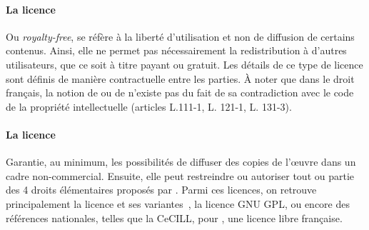         \paragraph{La licence }
            Ou \textit{royalty-free}, se réfère à la liberté d'utilisation et non de diffusion de certains contenus. Ainsi, elle ne permet pas nécessairement la redistribution à d'autres utilisateurs, que ce soit à titre payant ou gratuit. Les détails de ce type de licence sont définis de manière contractuelle entre les parties. À noter que dans le droit français, la notion de  ou de  n'existe pas du fait de sa contradiction avec le code de la propriété intellectuelle (articles L.111-1, L. 121-1, L. 131-3).
        \paragraph{La licence }
            Garantie, au minimum, les possibilités de diffuser des copies de l'œuvre dans un cadre non-commercial. Ensuite, elle peut restreindre ou autoriser tout ou partie des 4 droits élémentaires proposés par . Parmi ces licences, on retrouve principalement la licence 
             et ses variantes~, la licence GNU GPL, ou encore des références nationales, telles que la CeCILL, pour , une licence libre française.
